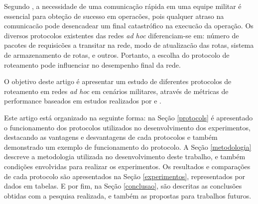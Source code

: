 Segundo \cite{salles}, a necessidade de uma comunica\c{c}\~ao r\'apida em uma equipe militar \'e essencial para obte\c{c}\~ao de sucesso em operac\~oes, pois qualquer atraso na comunicac\~ao pode desencadear um final catastr\'ofico na execuc\~ao da opera\c{c}\~ao. 
Os diversos protocolos existentes das redes \textit{ad hoc} diferenciam-se em: n\'umero de pacotes de requisic\~oes a transitar na rede, modo de atualizac\~ao das rotas, sistema de armazenamento de rotas, e outros. 
Portanto, a escolha do protocolo de roteamento pode influenciar no desempenho final da rede.

O objetivo deste artigo \'e apresentar um estudo de diferentes protocolos de roteamento em redes \textit{ad hoc} em cen\'arios militares, atrav\'es de m\'etricas de performance baseados em estudos realizados por \cite{pereira} e \cite{salles}.

Este artigo est\'a organizado na seguinte forma: na Se\c{c}\~ao \ref{protocols} \'e apresentado o funcionamento dos protocolos utilizados no desenvolvimento dos experimentos, destacando as vantagens e desvantagens de cada protocolos e tamb\'em demonstrado um exemplo de funcionamento do protocolo. 
A Se\c{c}\~ ao \ref{metodologia} descreve a metodologia utilizada no desenvolvimento deste trabalho, e tamb\'em condi\c{c}\~oes envolvidas para realizar os experimentos.
Os resultados e compara\c{c}\~oes de cada protocolo s\~ao apresentados na Se\c{c}\~ao \ref{experimentos}, representados por dados em tabelas. 
E por fim, na Se\c{c}\~ao \ref{conclusao}, s\~ao descritas as conclus\~oes obtidas com a pesquisa realizada, e tamb\'em as propostas para trabalhos futuros.
